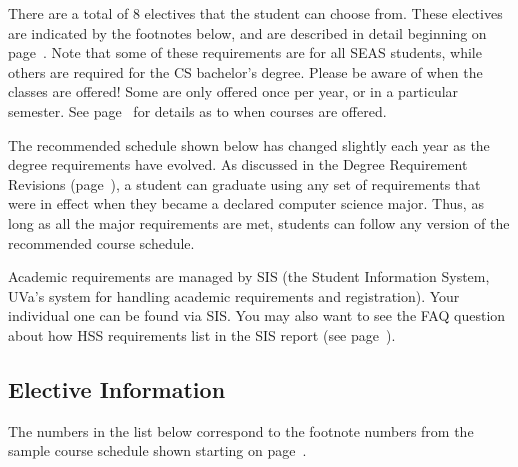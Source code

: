 \documentclass[10pt,letter]{book}
\newcommand{\myurl}[1]{\footnote{\scriptsize\url{#1}}}
\begin{document}
There are a total of 8 electives that the student can choose
from. These electives are indicated by the footnotes below, and are
described in detail beginning on page~\pageref{sec:electiveinfo}. Note
that some of these requirements are for all SEAS students, while
others are required for the CS bachelor's degree. Please be aware of
when the classes are offered! Some are only offered once per year, or
in a particular semester. See page~\pageref{sec:coursedesc} for details
as to when courses are offered.

The recommended schedule shown below has changed slightly each year as
the degree requirements have evolved. As discussed in the Degree
Requirement Revisions (page~\pageref{sec:degreerevisions}), a student
can graduate using any set of requirements that were in effect when
they became a declared computer science major. Thus, as long as all
the major requirements are met, students can follow any version of the
recommended course schedule.

Academic requirements are managed by SIS (the Student Information
System, UVa's system for handling academic requirements and
registration).
Your individual one can be found via SIS.  You may also want to see
the FAQ question about how HSS requirements list in the SIS report
(see page~\pageref{sec:sishssissue}).


\subsection{Elective Information}
\label{sec:electiveinfo}

The numbers in the list below correspond to the footnote numbers from
the sample course schedule shown starting on
page~\pageref{sec:bscsschedule}.
\end{document}

